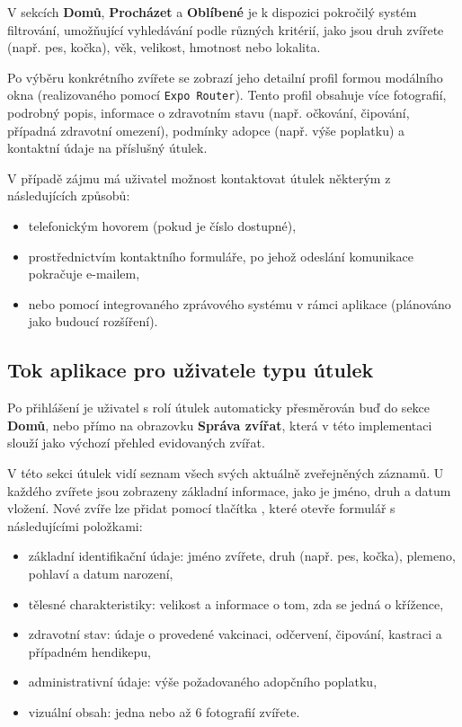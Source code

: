 \documentclass[czech, bp, kiv, he, iso690numb, pdf]{fasthesis}
\begin{document}
    V sekcích \textbf{Domů}, \textbf{Procházet} a \textbf{Oblíbené} je k dispozici pokročilý systém filtrování, umožňující vyhledávání podle různých kritérií, jako jsou druh zvířete (např. pes, kočka), věk, velikost, hmotnost nebo lokalita.

    Po výběru konkrétního zvířete se zobrazí jeho detailní profil formou modálního okna (realizovaného pomocí \texttt{Expo Router}). Tento profil obsahuje více fotografií, podrobný popis, informace o zdravotním stavu (např. očkování, čipování, případná zdravotní omezení), podmínky adopce (např. výše poplatku) a kontaktní údaje na příslušný útulek.

    V případě zájmu má uživatel možnost kontaktovat útulek některým z následujících způsobů:
    \begin{itemize}
        \item telefonickým hovorem (pokud je číslo dostupné),
        \item prostřednictvím kontaktního formuláře, po jehož odeslání komunikace pokračuje e-mailem,
        \item nebo pomocí integrovaného zprávového systému v rámci aplikace (plánováno jako budoucí rozšíření).
    \end{itemize}

    \subsection{Tok aplikace pro uživatele typu útulek}

    Po přihlášení je uživatel s rolí útulek automaticky přesměrován buď do sekce \textbf{Domů}, nebo přímo na obrazovku \textbf{Správa zvířat}, která v této implementaci slouží jako výchozí přehled evidovaných zvířat.

    V této sekci útulek vidí seznam všech svých aktuálně zveřejněných záznamů. U každého zvířete jsou zobrazeny základní informace, jako je jméno, druh a datum vložení. Nové zvíře lze přidat pomocí tlačítka , které otevře formulář s následujícími položkami:

    \begin{itemize}
        \item základní identifikační údaje: jméno zvířete, druh (např. pes, kočka), plemeno, pohlaví a datum narození,
        \item tělesné charakteristiky: velikost a informace o tom, zda se jedná o křížence,
        \item zdravotní stav: údaje o provedené vakcinaci, odčervení, čipování, kastraci a případném hendikepu,
        \item administrativní údaje: výše požadovaného adopčního poplatku,
        \item vizuální obsah: jedna nebo až 6 fotografií zvířete.
    \end{itemize}
\end{document}
